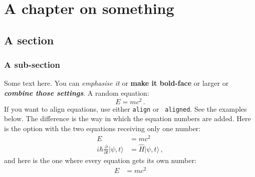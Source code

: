 \documentclass[11pt]{report}
\begin{document}
 

\chapter{A chapter on something}
\label{c:intro}
\section{A section}
\subsection{A sub-section}

Some text here. You can \emph{emphasise it} or {\bfseries make it
  bold-face} or {\large larger} or \emph{\bfseries\large combine those
  settings}. A random equation:
\begin{equation}
\label{e:Einstein1}
E=mc^2 \,.
\end{equation}
If you want to align equations, use either {\tt align} or {\tt
  aligned}. See the examples below. The difference is the way in which
the equation numbers are added. Here is the option with the two
equations receiving only one number:
\begin{equation}
\label{e:Einstein2}
\begin{aligned}
E &= mc^2  \\
i\hbar \frac{\partial}{\partial t} |\psi, t\rangle 
  &= \hat{H} |\psi,t\rangle\,,
\end{aligned}
\end{equation}
and here is the one where every equation gets its own number:
\begin{align}
\label{e:Einstein3}
E &= mc^2  \\
\end{align}
\end{document}
